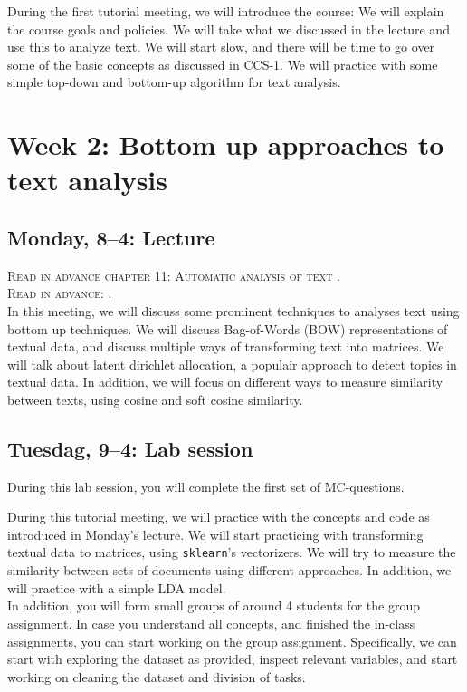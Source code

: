 During the first tutorial meeting, we will introduce the course: We will explain the course goals and policies. We will take what we discussed in the lecture and use this to analyze text. We will start slow, and there will be time to go over some of the basic concepts as discussed in CCS-1. We will practice with some simple top-down and bottom-up algorithm for text analysis.



\section*{Week 2:  Bottom up approaches to text analysis}

\subsection*{Monday, 8--4: Lecture}

\textsc{Read in advance chapter 11: Automatic analysis of text \cite{van_atteveldt_computational_2022}.} \\
\textsc{Read in advance: \cite{Brinberg2021}.} \\

In this meeting, we will discuss some prominent techniques to analyses text using bottom up techniques. We will discuss Bag-of-Words (BOW) representations of textual data, and discuss multiple ways of transforming text into matrices. We will talk about latent dirichlet allocation, a populair approach to detect topics in textual data. In addition, we will focus on different ways to measure similarity between texts, using cosine and soft cosine similarity. 


\subsection*{Tuesdag, 9--4: Lab session}
During this lab session, you will complete the first set of MC-questions. 

During this tutorial meeting, we will practice with the concepts and code as introduced in Monday's lecture.  We will start practicing with transforming textual data to matrices, using  \texttt{sklearn}'s vectorizers. We will try to measure the similarity between sets of documents using different approaches. In addition, we will practice with a simple LDA model. \\


In addition, you will form small groups of around 4 students for the group assignment. In case you understand all concepts, and finished the in-class assignments, you can start working on the group assignment. Specifically, we can start with exploring the dataset as provided, inspect relevant variables, and start working on cleaning the dataset and division of tasks. 

